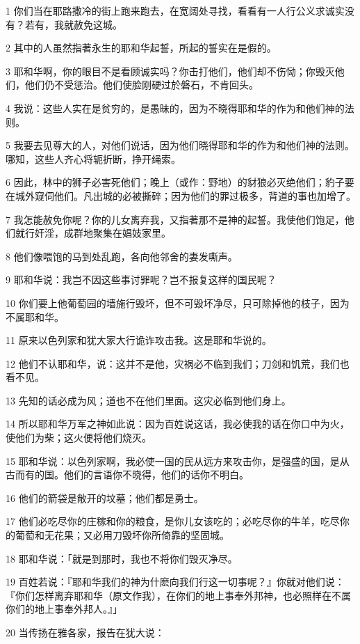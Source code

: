 \par 1 你们当在耶路撒冷的街上跑来跑去，在宽阔处寻找，看看有一人行公义求诚实没有？若有，我就赦免这城。
\par 2 其中的人虽然指著永生的耶和华起誓，所起的誓实在是假的。
\par 3 耶和华啊，你的眼目不是看顾诚实吗？你击打他们，他们却不伤恸；你毁灭他们，他们仍不受惩治。他们使脸刚硬过於磐石，不肯回头。
\par 4 我说：这些人实在是贫穷的，是愚昧的，因为不晓得耶和华的作为和他们神的法则。
\par 5 我要去见尊大的人，对他们说话，因为他们晓得耶和华的作为和他们神的法则。哪知，这些人齐心将轭折断，挣开绳索。
\par 6 因此，林中的狮子必害死他们；晚上（或作：野地）的豺狼必灭绝他们；豹子要在城外窥伺他们。凡出城的必被撕碎；因为他们的罪过极多，背道的事也加增了。
\par 7 我怎能赦免你呢？你的儿女离弃我，又指著那不是神的起誓。我使他们饱足，他们就行奸淫，成群地聚集在娼妓家里。
\par 8 他们像喂饱的马到处乱跑，各向他邻舍的妻发嘶声。
\par 9 耶和华说：我岂不因这些事讨罪呢？岂不报复这样的国民呢？
\par 10 你们要上他葡萄园的墙施行毁坏，但不可毁坏净尽，只可除掉他的枝子，因为不属耶和华。
\par 11 原来以色列家和犹大家大行诡诈攻击我。这是耶和华说的。
\par 12 他们不认耶和华，说：这并不是他，灾祸必不临到我们；刀剑和饥荒，我们也看不见。
\par 13 先知的话必成为风；道也不在他们里面。这灾必临到他们身上。
\par 14 所以耶和华万军之神如此说：因为百姓说这话，我必使我的话在你口中为火，使他们为柴；这火便将他们烧灭。
\par 15 耶和华说：以色列家啊，我必使一国的民从远方来攻击你，是强盛的国，是从古而有的国。他们的言语你不晓得，他们的话你不明白。
\par 16 他们的箭袋是敞开的坟墓；他们都是勇士。
\par 17 他们必吃尽你的庄稼和你的粮食，是你儿女该吃的；必吃尽你的牛羊，吃尽你的葡萄和无花果；又必用刀毁坏你所倚靠的坚固城。
\par 18 耶和华说：「就是到那时，我也不将你们毁灭净尽。
\par 19 百姓若说：『耶和华我们的神为什麽向我们行这一切事呢？』你就对他们说：『你们怎样离弃耶和华（原文作我），在你们的地上事奉外邦神，也必照样在不属你们的地上事奉外邦人。』」
\par 20 当传扬在雅各家，报告在犹大说：
